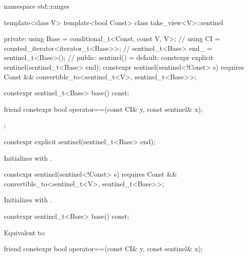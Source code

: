 %
\begin{codeblock}
namespace std::ranges {
  template<class V>
  template<bool Const>
  class take_view<V>::sentinel {
  private:
    using Base = conditional_t<Const, const V, V>;      // \expos
    using CI = counted_iterator<iterator_t<Base>>;      // \expos
    sentinel_t<Base> end_ = sentinel_t<Base>();         // \expos
  public:
    sentinel() = default;
    constexpr explicit sentinel(sentinel_t<Base> end);
    constexpr sentinel(sentinel<!Const> s)
      requires Const && convertible_to<sentinel_t<V>, sentinel_t<Base>>;

    constexpr sentinel_t<Base> base() const;

    friend constexpr bool operator==(const CI& y, const sentinel& x);
  };
}
\end{codeblock}

%
\begin{itemdecl}
constexpr explicit sentinel(sentinel_t<Base> end);
\end{itemdecl}

\begin{itemdescr}
\pnum
\effects
Initializes  with .
\end{itemdescr}

%
\begin{itemdecl}
constexpr sentinel(sentinel<!Const> s)
  requires Const && convertible_to<sentinel_t<V>, sentinel_t<Base>>;
\end{itemdecl}

\begin{itemdescr}
\pnum
\effects
Initializes  with .
\end{itemdescr}

%
\begin{itemdecl}
constexpr sentinel_t<Base> base() const;
\end{itemdecl}

\begin{itemdescr}
\pnum
\effects
Equivalent to: 
\end{itemdescr}

%
\begin{itemdecl}
friend constexpr bool operator==(const CI& y, const sentinel& x);
\end{itemdecl}

